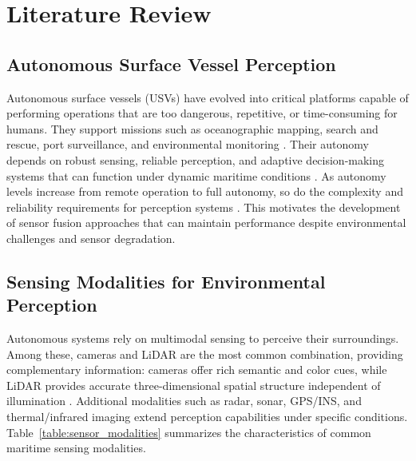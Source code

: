 \documentclass{erauthesis}
\begin{document}
\chapter{Literature Review} \label{litReview}


\section{Autonomous Surface Vessel Perception}

Autonomous surface vessels (\acp{USV}) have evolved into critical platforms capable of performing operations that are too dangerous, repetitive, or time-consuming for humans. They support missions such as oceanographic mapping, search and rescue, port surveillance, and environmental monitoring \cite{liebergall, eckstein2024}. Their autonomy depends on robust sensing, reliable perception, and adaptive decision-making systems that can function under dynamic maritime conditions \cite{bai2022}.
As autonomy levels increase from remote operation to full autonomy, so do the complexity and reliability requirements for perception systems \cite{zotero-item-1911,huang}.
This motivates the development of sensor fusion approaches that can maintain performance despite environmental challenges and sensor degradation.


\section{Sensing Modalities for Environmental Perception}

Autonomous systems rely on multimodal sensing to perceive their surroundings. Among these, cameras and LiDAR are the most common combination, providing complementary information: cameras offer rich semantic and color cues, while LiDAR provides accurate three-dimensional spatial structure independent of illumination \cite{yeong2021}. 
Additional modalities such as radar, sonar, GPS/INS, and thermal/infrared imaging extend perception capabilities under specific conditions.
Table~\ref{table:sensor_modalities} summarizes the characteristics of common maritime sensing modalities. 
\end{document}

